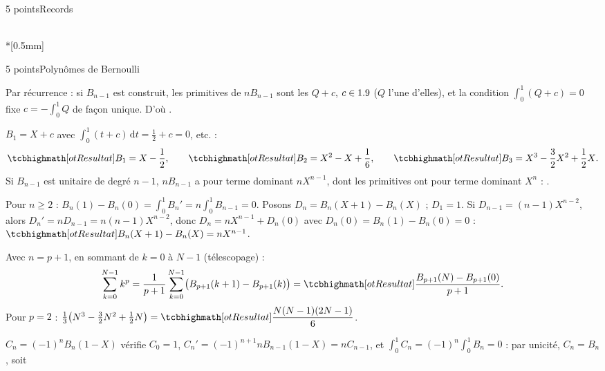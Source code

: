 \begin{corrigeEval}{5 points}{Records}
\begin{center}
\begin{minipage}{\linewidth}
\\*[0.5mm]
\end{minipage}\end{center}
\end{corrigeEval}

\begin{corrigeEval}{5 points}{Polynômes de Bernoulli}
\begin{questions}
  \item Par récurrence : si $B_{n-1}$ est construit, les primitives de
    $nB_{n-1}$ sont les $Q+c$, $c\in1.9$ ($Q$ l'une d'elles), et la condition
    $\int_0^{1}(Q+c)=0$ fixe $c=-\int_0^{1}Q$ de façon unique. D'où
    . \pts{1 pt}
  \item $B_1=X+c$ avec $\int_0^{1}(t+c)\,\mathrm{d}t=\frac12+c=0$, etc. :
    \[\res{B_1=X-\frac12},\qquad\res{B_2=X^{2}-X+\frac16},\qquad
      \res{B_3=X^{3}-\frac32X^{2}+\frac12X}.\]
    Si $B_{n-1}$ est unitaire de degré $n-1$, $nB_{n-1}$ a pour terme
    dominant $nX^{n-1}$, dont les primitives ont pour terme dominant
    $X^{n}$ : . \pts{1 pt}
  \item Pour $n\geqslant2$ :
    $B_n(1)-B_n(0)=\int_0^{1}B_n'=n\int_0^{1}B_{n-1}=0$. Posons
    $D_n=B_n(X+1)-B_n(X)$ ; $D_1=1$. Si $D_{n-1}=(n-1)X^{n-2}$, alors
    $D_n'=nD_{n-1}=n(n-1)X^{n-2}$, donc $D_n=nX^{n-1}+D_n(0)$ avec
    $D_n(0)=B_n(1)-B_n(0)=0$ :
    $\res{B_n(X+1)-B_n(X)=nX^{n-1}}$. \pts{1 pt}
  \item Avec $n=p+1$, en sommant de $k=0$ à $N-1$ (télescopage) :
    \[\sum_{k=0}^{N-1}k^{p}=\frac{1}{p+1}\sum_{k=0}^{N-1}\bigl(B_{p+1}(k+1)-B_{p+1}(k)\bigr)
      =\res{\frac{B_{p+1}(N)-B_{p+1}(0)}{p+1}}.\]
    Pour $p=2$ :
    $\frac13\bigl(N^{3}-\frac32N^{2}+\frac12N\bigr)=\res{\dfrac{N(N-1)(2N-1)}{6}}$.
    \pts{1 pt}
  \item $C_n=(-1)^{n}B_n(1-X)$ vérifie $C_0=1$,
    $C_n'=(-1)^{n+1}nB_{n-1}(1-X)=nC_{n-1}$, et
    $\int_0^{1}C_n=(-1)^{n}\int_0^{1}B_n=0$ : par unicité, $C_n=B_n$, soit

\end{questions}
\end{corrigeEval}
